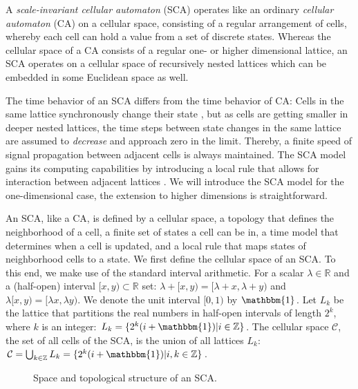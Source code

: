 \documentclass[pre,amssymb,showpacs,showkeys,preprint]{revtex4}
\begin{document}
A \emph{scale-invariant cellular automaton} (SCA) operates like an ordinary
\emph{cellular automaton} (CA) on a cellular space, consisting of a regular arrangement of cells,
whereby each cell can hold a value from a set of discrete states.
Whereas the cellular space of a CA consists of a regular one- or higher
dimensional lattice, an SCA operates on a cellular space of recursively nested lattices
which can be embedded in some Euclidean space as well.

The time behavior of an SCA differs from the time behavior of CA:
Cells in the same lattice synchronously change their state \cite{Morelli_Zanette}, but
as cells are getting smaller in deeper nested lattices, the time steps between state changes in
the same lattice are assumed to {\em decrease} and approach zero in the limit.
Thereby, a finite speed of signal propagation between adjacent cells is always maintained.
The SCA model gains its  computing capabilities by introducing a local rule that
allows for interaction between adjacent lattices \cite{BoFeng_MengDing}.
We will introduce the SCA model for the one-dimensional case, the extension to higher dimensions
\cite{Brunnet_Chate} is
straightforward.

An SCA, like a CA, is defined by a cellular space, a topology that defines the neighborhood of a cell, a finite set of
states a cell can be in,  a time model that determines when a cell is updated, and a local rule that
maps states of neighborhood cells to a state.
We first define the cellular space of an SCA.
To this end, we make use of the standard interval arithmetic.
For a scalar $\lambda \in \mathbb{R}$ and a (half-open) interval $[x,y) \subset \mathbb{R}$ set:
$\lambda + [x,y) = [\lambda + x, \lambda + y)$ and $\lambda [x,y) = [\lambda x, \lambda y)$.
We denote the unit interval $[0,1)$ by $\mathbbm{1}$.
Let $L_k$ be the lattice that partitions the real numbers in half-open intervals of length $2^k$, where $k$ is an integer:
$L_k = \{2^k (i + \mathbbm{1})| i \in \mathbb Z\}$.
 The cellular space $\mathcal{C}$, the set of all cells of the SCA, is the union of all lattices $L_k$:
$\mathcal{C} = \bigcup_{k \in \mathbb Z} L_k = \{ 2^k (i + \mathbbm{1}) | i, k \in \mathbb Z\}$.

\begin{figure}
\begin{center}
\caption{\label{fig:1-dim-interaction} Space and topological structure of an SCA.}
\end{center}
\end{figure}
\end{document}

